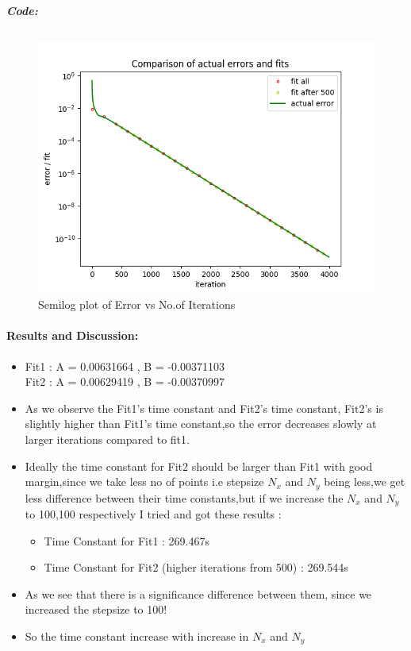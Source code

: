 \documentclass[11pt, a4paper, twoside]{article}
\begin{document}
\textit{\textbf{Code:}}
\inputminted[linenos, breaklines]{python}{Code/3.py}
\begin{figure}[!tbh]
 \centering
 \includegraphics[scale=0.8]{Plots/Fig4.png}  
 \caption{Semilog plot of Error vs No.of Iterations}
\end{figure}

\paragraph{Results and Discussion:}\label{results-and-discussion3}

\begin{itemize}
\item 
Fit1 : A = 0.00631664 , B = -0.00371103\\
Fit2 : A = 0.00629419 , B = -0.00370997
\item
  As we observe the Fit1's time constant and Fit2's time constant,
  Fit2's is slightly higher than Fit1's time constant,so the error
  decreases slowly at larger iterations compared to fit1.
\item
  Ideally the time constant for Fit2 should be larger than Fit1 with
  good margin,since we take less no of points i.e stepsize \(N_x\) and
  \(N_y\) being less,we get less difference between their time
  constants,but if we increase the \(N_x\) and \(N_y\) to 100,100
  respectively I tried and got these results :

  \begin{itemize}
  \item
    Time Constant for Fit1 : 269.467s
  \item
    Time Constant for Fit2 (higher iterations from 500) : 269.544s
  \end{itemize}
\item
  As we see that there is a significance difference between them, since
  we increased the stepsize to 100!
\item
  So the time constant increase with increase in \(N_x\) and \(N_y\)
\end{itemize}
\end{document}
